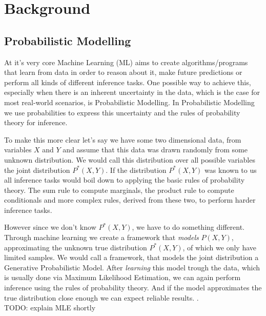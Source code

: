 \usetikzlibrary{calc}

\renewcommand{\vec}[1]{\textbf{#1}}
\newcommand{\norm}[1]{\left\lVert#1\right\rVert}


\chapter{Background}
\label{cha:background}

\section{Probabilistic Modelling}
\label{sec:pm}

At it's very core Machine Learning (ML) aims to create algorithms/programs that learn from data in order to reason about it, make future
predictions or perform all kinds of different inference tasks. One possible way to achieve this, especially when there is an inherent 
uncertainty in the data, which is the case for most real-world scenarios, is Probabilistic Modelling. In Probabilistic Modelling we 
use probabilities to express this uncertainty and the rules of probability theory for inference. 

To make this more clear let's say we have some two dimensional data, from variables $X$ and $Y$ and assume that this data was drawn randomly from some unknown distribution. 
We would call this distribution over all possible variables the joint distribution $P^*(X, Y)$. 
If the distribution $P^*(X, Y)$ was known to us all inference tasks would boil down to applying the basic 
rules of probability theory. The sum rule to compute marginals, the product rule to compute conditionals and more complex rules, derived 
from these two, to perform harder inference tasks. 

However since we don't know $P^*(X, Y)$, we have to do something different.
Through machine learning we create a framework that \emph{models} $P(X, Y)$, approximating the unknown true distribution $P^*(X, Y)$, of which we only have limited samples.
We would call a framework, that models the joint distribution a Generative Probabilistic Model. 
After \emph{learning} this model trough the data, which is usually done via Maximum Likelihood Estimation, we can again perform inference using the rules 
of probability theory. And if the model approximates the true distribution close enough we can expect reliable results. \cite{pc_intro}. \\

TODO: explain MLE shortly

